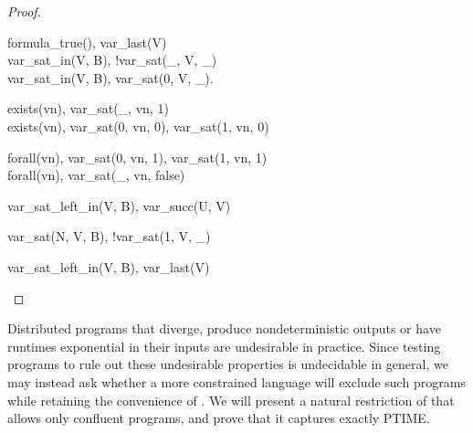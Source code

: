 \begin{proof}
\begin{Drules}
        {formula\_true(), var\_last(V)} \\
        {var\_sat\_in(V, B), !var\_sat(\_, V, \_)} \\
        {var\_sat\_in(V, B), var\_sat(0, V, \_).} \\
\end{Drules}

\begin{Drules}
        {exists(vn), var\_sat(\_, vn, 1)} \\
        {exists(vn), var\_sat(0, vn, 0), var\_sat(1, vn, 0)} \\
\end{Drules}

\begin{Drules}
        {forall(vn), var\_sat(0, vn, 1), var\_sat(1, vn, 1)} \\
        {forall(vn), var\_sat(\_, vn, false)} \\
\end{Drules}

\begin{Drules}
        {var\_sat\_left\_in(V, B), var\_succ(U, V)} \\
\end{Drules}

\begin{Drules}
        {var\_sat(N, V, B), !var\_sat(1, V, \_)} \\
\end{Drules}

\begin{Drules}
        {var\_sat\_left\_in(V, B), var\_last(V)}
\end{Drules}
\end{proof}



Distributed programs that diverge, produce nondeterministic outputs or have
runtimes exponential in their inputs are undesirable in practice.  Since testing
\lang programs to rule out these undesirable properties is undecidable in
general, we may instead ask whether a more constrained language will exclude
such programs while retaining the convenience of \lang.  We will present a
natural restriction of \lang that allows only confluent programs, and prove that
it captures exactly PTIME.

